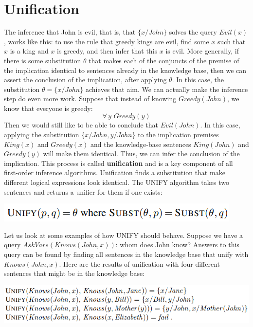 \section{Unification}
The inference that John is evil, that is, that $\{x/John\}$ solves the query $Evil(x)$, works like this: to use the rule that greedy kings are evil, find some $x$ such that $x$ is a king and $x$ is
greedy, and then infer that this $x$ is evil.\newline\newline
More generally, if there is some substitution $\theta$ that makes each of the conjuncts of the premise of the implication identical to sentences already in the knowledge base, then we can assert the conclusion of the implication, after applying $\theta$. In this case, the substitution $\theta = \{x/John\}$ achieves that aim.\newline\newline
We can actually make the inference step do even more work. Suppose that instead of knowing $Greedy(John)$, we know that everyone is greedy:
\[\forall \, y \,\, Greedy(y)\]
Then we would still like to be able to conclude that $Evil(John)$.  In this case, applying the substitution $\{x/John, y/John\}$ to the implication premises $King(x)$ and $Greedy(x)$ and the knowledge-base sentences $King(John)$ and $Greedy(y)$ will make them identical. Thus, we can infer the conclusion of the implication.\newline\newline
This process is called \textbf{unification} and is a key component of all first-order inference algorithms. Unification finds a substitution that make different logical expressions look identical. The UNIFY algorithm takes two sentences and returns a unifier for them if one exists:
\begin{center}
    \includegraphics[]{images/unification.png}
\end{center}
Let us look at some examples of how UNIFY should behave. Suppose we have a query $AskVars(Knows(John, x))$: whom does John know? Answers to this query can be found by finding all sentences in the knowledge base that unify with $Knows(John, x)$. Here are the results of unification with four different sentences that might be in the knowledge base:
\begin{center}
    \includegraphics[]{images/unification ex.png}
\end{center}
